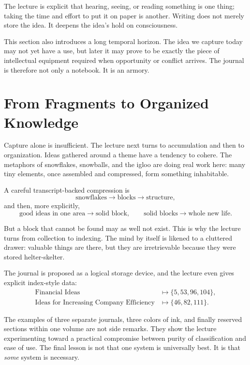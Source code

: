 The lecture is explicit that hearing, seeing, or reading something is one thing; taking the time and effort to put it on paper is another. Writing does not merely store the idea. It deepens the idea's hold on consciousness.

This section also introduces a long temporal horizon. The idea we capture today may not yet have a use, but later it may prove to be exactly the piece of intellectual equipment required when opportunity or conflict arrives. The journal is therefore not only a notebook. It is an armory.

\section{From Fragments to Organized Knowledge}

Capture alone is insufficient. The lecture next turns to accumulation and then to organization. Ideas gathered around a theme have a tendency to cohere. The metaphors of snowflakes, snowballs, and the igloo are doing real work here: many tiny elements, once assembled and compressed, form something inhabitable.

A careful transcript-backed compression is
\begin{equation}
\text{snowflakes}\rightarrow \text{blocks}\rightarrow \text{structure},
\end{equation}
and then, more explicitly,
\begin{equation}
\text{good ideas in one area}\rightarrow \text{solid block},\qquad
\text{solid blocks}\rightarrow \text{whole new life}.
\end{equation}

But a block that cannot be found may as well not exist. This is why the lecture turns from collection to indexing. The mind by itself is likened to a cluttered drawer: valuable things are there, but they are irretrievable because they were stored helter-skelter.

The journal is proposed as a logical storage device, and the lecture even gives explicit index-style data:
\begin{align}
\text{Financial Ideas}&\mapsto \{5,53,96,104\},\\
\text{Ideas for Increasing Company Efficiency}&\mapsto \{46,82,111\}.
\end{align}

The examples of three separate journals, three colors of ink, and finally reserved sections within one volume are not side remarks. They show the lecture experimenting toward a practical compromise between purity of classification and ease of use. The final lesson is not that one system is universally best. It is that \emph{some} system is necessary.

